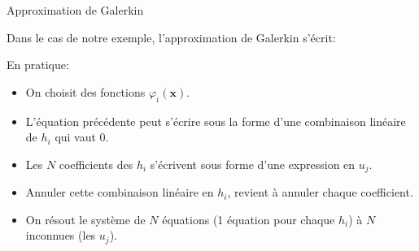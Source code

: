 \documentclass[
mode=present,    %
paper=a4paper,   %
orient=landscape,
display=slides,   %
size=10pt,     %
style=romain   %
]{powerdot}
\begin{document}
\begin{slide}[toc=]{Approximation de Galerkin}

Dans le cas de notre exemple, l'approximation de Galerkin s'écrit:

\bigskip

\noindent{} %

\bigskip

En pratique:
\begin{itemize}
\item On choisit des fonctions $\varphi_i(\boldsymbol{x})$.
\item L'équation précédente peut s'écrire sous la forme d'une combinaison linéaire de $h_i$ qui vaut 0.
\item Les $N$ coefficients des $h_i$ s'écrivent sous forme d'une expression en $u_j$.
\item Annuler cette combinaison linéaire en $h_i$, revient à annuler chaque coefficient.
\item On résout le système de $N$ équations (1 équation pour chaque $h_i$) à $N$ inconnues (les $u_j$).
\end{itemize}

\end{slide}
\end{document}
